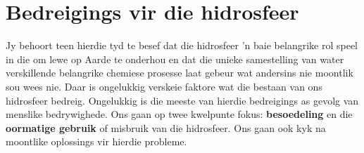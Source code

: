 \section{Bedreigings vir die hidrosfeer}
            \nopagebreak

Jy behoort teen hierdie tyd te besef dat die hidrosfeer  'n baie belangrike rol speel in die om lewe op Aarde te onderhou en dat die unieke samestelling van water verskillende belangrike chemiese prosesse laat gebeur wat andersins nie moontlik sou wees nie. Daar is ongelukkig verskeie faktore wat die bestaan van ons hidrosfeer bedreig. Ongelukkig is die meeste van hierdie bedreigings as gevolg van menslike bedrywighede. Ons gaan op twee kwelpunte fokus: \textbf{besoedeling} en die \textbf{oormatige gebruik} of misbruik van die hidrosfeer. Ons gaan ook kyk na moontlike oplossings vir hierdie probleme.

 \\

